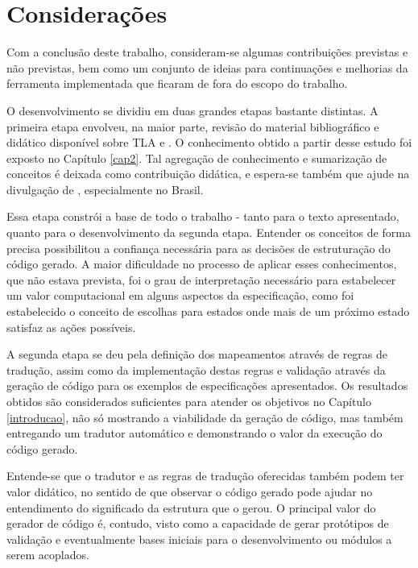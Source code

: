 \chapter{Considerações}


Com a conclusão deste trabalho, consideram-se algumas contribuições previstas e
não previstas, bem como um conjunto de ideias para continuações e melhorias
da ferramenta implementada que ficaram de fora do escopo do trabalho.

O desenvolvimento se dividiu em duas grandes etapas bastante distintas. A
primeira etapa envolveu, na maior parte, revisão do material bibliográfico e
didático disponível sobre TLA e \TLAA. O conhecimento obtido a partir desse
estudo foi exposto no Capítulo \ref{cap2}. Tal agregação de conhecimento e
sumarização de conceitos é deixada como contribuição didática, e espera-se
também que ajude na divulgação de \TLAA, especialmente no Brasil.

Essa etapa constrói a base de todo o trabalho - tanto para o texto apresentado,
quanto para o desenvolvimento da segunda etapa. Entender os conceitos de forma
precisa possibilitou a confiança necessária para as decisões de estruturação do
código gerado. A maior dificuldade no processo de aplicar esses conhecimentos,
que não estava prevista, foi o grau de interpretação necessário para estabelecer
um valor computacional em alguns aspectos da especificação, como foi
estabelecido o conceito de escolhas para estados onde mais de um próximo estado
satisfaz as ações possíveis.

A segunda etapa se deu pela definição dos mapeamentos através de regras de
tradução, assim como da implementação destas regras e validação através da
geração de código para os exemplos de especificações apresentados. Os resultados
obtidos são considerados suficientes para atender os objetivos no Capítulo
\ref{introducao}, não só mostrando a viabilidade da geração de código, mas
também entregando um tradutor automático e demonstrando o valor da execução do
código gerado.

Entende-se que o tradutor e as regras de tradução oferecidas também podem ter
valor didático, no sentido de que observar o código gerado pode ajudar no
entendimento do significado da estrutura que o gerou. O principal valor do
gerador de código é, contudo, visto como a capacidade de gerar protótipos de
validação e eventualmente bases iniciais para o desenvolvimento ou módulos a
serem acoplados. 

